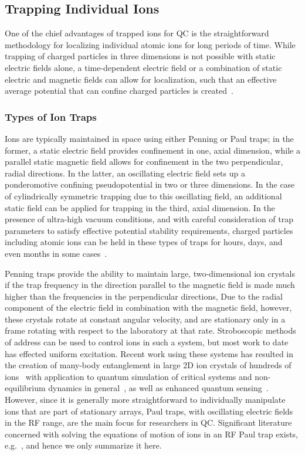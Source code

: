 \documentclass[%
reprint,
 amsmath,amssymb,
]{revtex4-1}
\begin{document}
\subsection{Trapping Individual Ions}

One of the chief advantages of trapped ions for QC is the straightforward methodology for localizing individual atomic ions for long periods of time.  While trapping of charged particles in three dimensions is not possible with static electric fields alone, a time-dependent electric field or a combination of static electric and magnetic fields can allow for localization, such that an effective average potential that can confine charged particles is created~\cite{DEHMELT196853,RevModPhys.62.531}.

\subsubsection{Types of Ion Traps}

Ions are typically maintained in space using either Penning or Paul traps; in the former, a static electric field provides confinement in one, axial dimension, while a parallel static magnetic field allows for confinement in the two perpendicular, radial directions.  In the latter, an oscillating electric field sets up a ponderomotive confining pseudopotential in two or three dimensions.  In the case of cylindrically symmetric trapping due to this oscillating field, an additional static field can be applied for trapping in the third, axial dimension.  In the presence of ultra-high vacuum conditions, and with careful consideration of trap parameters to satisfy effective potential stability requirements, charged particles including atomic ions can be held in these types of traps for hours, days, and even months in some cases~\cite{PhysRevLett.65.1317}.

Penning traps provide the ability to maintain large, two-dimensional ion crystals if the trap frequency in the direction parallel to the magnetic field is made much higher than the frequencies in the perpendicular directions,   Due to the radial component of the electric field in combination with the magnetic field, however, these crystals rotate at constant angular velocity, and are stationary only in a frame rotating with respect to the laboratory at that rate.  Stroboscopic methods of address can be used to control ions in such a system, but most work to date has effected uniform excitation.  Recent work using these systems has resulted in the creation of many-body entanglement in large 2D ion crystals of hundreds of ions~\cite{Britton2012} with application to quantum simulation of critical systems and non-equilibrium dynamics in general~\cite{Garttner2017,PhysRevLett.121.040503}, as well as enhanced quantum sensing~\cite{PhysRevLett.118.263602}.  However, since it is generally more straightforward to individually manipulate ions that are part of stationary arrays, Paul traps, with oscillating electric fields in the RF range, are the main focus for researchers in QC.  Significant literature concerned with solving the equations of motion of ions in an RF Paul trap exists, e.g.~\cite{RevModPhys.62.531,Wineland1998,leibfried2003quantum}, and hence we only summarize it here.
\end{document}
